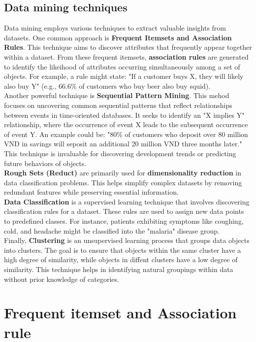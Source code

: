 \section{Data mining techniques}
Data mining employs various techniques to extract valuable insights from datasets. One common approach is \textbf{Frequent Itemsets and Association Rules}. This technique aims to discover attributes that frequently appear together within a dataset. From these frequent itemsets, \textbf{association rules} are generated to identify the likeihood of attributes occurring simultaneously among a set of objects. For example, a rule might state: "If a customer buys X, they will likely also buy Y" (e.g., 66.6\% of customers who buy beer also buy squid).\\
Another powerful technique is \textbf{Sequential Pattern Mining}. This mehod focuses on uncovering common sequential patterns that reflect relationships between events in time-oriented databases. It seeks to identify an "X implies Y" relationship, where the occurrence of event X leads to the subsequent occurrence of event Y. An example could be: "80\% of customers who deposit over 80 million VND in savings will seposit an additional 20 million VND three months later." This technique is invaluable for discovering development trends or predicting future behaviors of objects.\\
\textbf{Rough Sets (Reduct)} are primarily used for \textbf{dimensionality reduction} in data classification problems. This helps simplify complex datasets by removing redundant features while preserving essential information.\\
\textbf{Data Classification} is a supervised learning technique that involves discovering classification rules for a dataset. These rules are used to assign new data points to predefined classes. For instance, patients exhibiting symptoms like coughing, cold, and headache might be classified into the "malaria" disease group.\\
Finally, \textbf{Clustering} is an unsupervised learning process that groups data objects into clusters. The goal is to ensure that objects within the same cluster have a high degree of similarity, while objects in diffent clusters have a low degree of similarity. This technique helps in identifying natural groupings within data without prior knowledge of categories.
\chapter{Frequent itemset and Association rule}
